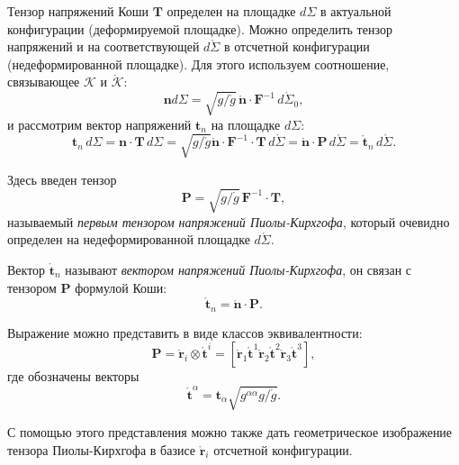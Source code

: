Тензор напряжений Коши $\mathbf{T}$ определен на площадке $d\Sigma$ в актуальной конфигурации (деформируемой площадке). Можно определить тензор напряжений и на соответствующей $d\mathring{\Sigma}$ в отсчетной конфигурации (недеформированной площадке). Для этого используем соотношение, связывающее $\mathcal{K}$ и $\mathring{\mathcal{K}}$:
\begin{equation*}
	\mathbf{n} d\Sigma = \sqrt{g / \mathring{g}} \, \mathring{\mathbf{n}} \cdot \mathbf{F}^{-1} \, d\mathring{\Sigma}_0,
\end{equation*} 
и рассмотрим вектор напряжений $\mathbf{t}_n$ на площадке $d\Sigma$:
\begin{equation*}
	\mathbf{t}_n \, d\Sigma = \mathbf{n} \cdot \mathbf{T} \, d\Sigma = \sqrt{g / \mathring{g}} \mathring{\mathbf{n}} \cdot \mathbf{F}^{-1} \cdot \mathbf{T} \, d\mathring{\Sigma} = \mathring{\mathbf{n}} \cdot \mathbf{P} \, d\mathring{\Sigma} = \mathring{\mathbf{t}}_n \, d\mathring{\Sigma}.
\end{equation*}

Здесь введен тензор 
\begin{equation*}
	\mathbf{P} = \sqrt{g / \mathring{g}} \, \mathbf{F}^{-1} \cdot \mathbf{T},
\end{equation*}
называемый \textit{первым тензором напряжений Пиолы-Кирхгофа}, который очевидно определен на недеформированной площадке $d\mathring{\Sigma}$. 

Вектор $\mathring{\mathbf{t}}_n$ называют \textit{вектором напряжений Пиолы-Кирхгофа}, он связан с тензором $\mathbf{P}$ формулой Коши:
\begin{equation*}
	\mathring{\mathbf{t}}_n = \mathring{\mathbf{n}} \cdot \mathbf{P}.
\end{equation*}

Выражение можно представить в виде классов эквивалентности:
\begin{equation*}
	\mathbf{P} = \mathring{\mathbf{r}}_i \otimes \mathring{\mathbf{t}}^i = \left[\mathring{\mathbf{r}}_1 \mathring{\mathbf{t}}^1 \mathring{\mathbf{r}}_2 \mathring{\mathbf{t}}^2 \mathring{\mathbf{r}}_3 \mathring{\mathbf{t}}^3\right], 
\end{equation*}
где обозначены векторы
\begin{equation*}
	\mathring{\mathbf{t}}^{\alpha} = \mathbf{t}_{\alpha} \sqrt{g^{\alpha \alpha} g / \mathring{g}}.
\end{equation*}

С помощью этого представления можно также дать геометрическое изображение тензора Пиолы-Кирхгофа в базисе $\mathring{\mathbf{r}}_i$ отсчетной конфигурации.

